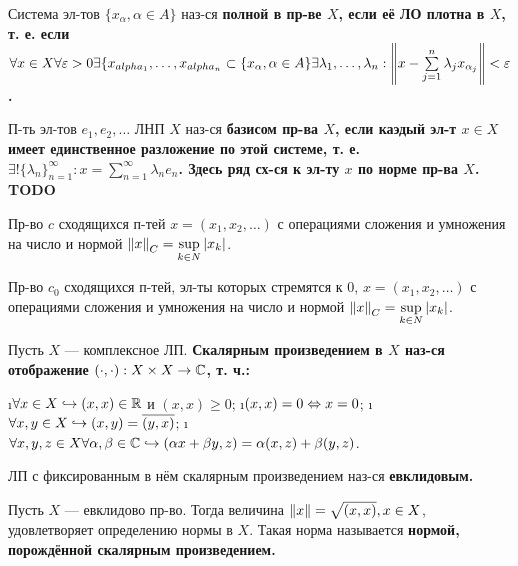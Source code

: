 \begin{defn}
Система эл-тов $\{x_\alpha, \alpha \in A\}$ наз-ся \bf{полной} в пр-ве $X$, если её ЛО плотна в $X$, т. е. если $\forall x \in X \forall \varepsilon > 0 \exists \{x_{alpha_1}, \dots, x_{alpha_n} \subset \{x_\alpha, \alpha \in A\} \exists \lambda_1, \dots, \lambda_n: \left\lVert x-\sum\limits_{j=1}^n \lambda_j x_{\alpha_j}\right\rVert < \varepsilon$.
\end{defn}

\begin{defn}
П-ть эл-тов $e_1, e_2, \dots$ ЛНП $X$ наз-ся \bf{базисом} пр-ва $X$, если каэдый эл-т $x \in X$ имеет единственное разложение по этой системе, т. е. $\exists ! \{\lambda_n\}_{n=1}^\infty: x = \sum\limits_{n=1}^\infty \lambda_n e_n$. Здесь ряд сх-ся к эл-ту $x$ по норме пр-ва $X$. TODO
\end{defn}

\begin{defn}
Пр-во $c$ сходящихся п-тей $x=(x_1, x_2, \dots)$ с операциями сложения и умножения на число и нормой $\left\lVert x\right\rVert_C = \sup\limits_{k \in N} |x_k|$.
\end{defn}

\begin{defn}
Пр-во $c_0$ сходящихся п-тей, эл-ты которых стремятся к 0, $x=(x_1, x_2, \dots)$ с операциями сложения и умножения на число и нормой $\left\lVert x\right\rVert_C = \sup\limits_{k \in N} |x_k|$.
\end{defn}

\begin{defn}
Пусть $X$ --- комплексное ЛП. \bf{Скалярным произведением} в $X$ наз-ся отображение $(\cdot, \cdot): X \times X \rightarrow \mathbb{C}$, т. ч.:
\begin{enumerate}
\i $\forall x \in X \hookrightarrow (x, x) \in \mathbb{R}$ и $(x, x) \ge 0$;
\i $(x, x)=0 \Leftrightarrow x = 0$;
\i $\forall x, y \in X \hookrightarrow (x, y) = \overline{(y, x)}$;
\i $\forall x, y, z \in X \forall \alpha, \beta \in \mathbb{C} \hookrightarrow (\alpha x + \beta y, z) = \alpha (x, z) + \beta(y, z)$.
\end{enumerate}
\end{defn}

\begin{defn}
ЛП с фиксированным в нём скалярным произведением наз-ся \bf{евклидовым}.
\end{defn}

\begin{stmt}
Пусть $X$ --- евклидово пр-во. Тогда величина $\left\lVert x\right\rVert = \sqrt{(x, x)}, x \in X$, удовлетворяет определению нормы в $X$. Такая норма называется \bf{нормой, порождённой скалярным произведением}. 
\end{stmt}

